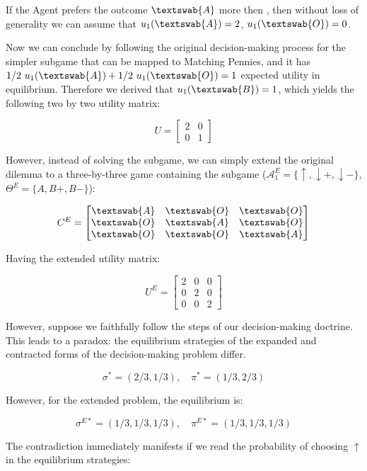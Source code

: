 \documentclass{article}
\begin{document}
If the Agent prefers the outcome $\textswab{A}$ more then , then without loss of generality we can assume that $u_1(\textswab{A})=2$, $u_1(\textswab{O})=0$.

Now we can conclude by following the original decision-making process for the simpler subgame that can be mapped to Matching Pennies, and it has $1/2 \ u_1(\textswab{A}) + 1/2 \ u_1(\textswab{O}) = 1$ expected utility in equilibrium. Therefore we derived that $u_1(\textswab{B}) = 1$, which yields the following two by two utility matrix:

\[
U=
\begin{bmatrix}
2 & 0 \\
0 & 1
\end{bmatrix}
\]

However, instead of solving the subgame, we can simply extend the original dilemma to a three-by-three game containing the subgame ($\mathcal{A}^E_1=\{\uparrow,\downarrow+,\downarrow-\}$, $\Theta^E=\{A,B+,B-\}$):

\[
C^E=
\begin{bmatrix}
\textswab{A} & \textswab{O} & \textswab{O} \\
\textswab{O} & \textswab{A} & \textswab{O} \\
\textswab{O} & \textswab{O} & \textswab{A}
\end{bmatrix}
\]

Having the extended utility matrix:

\[
U^E=
\begin{bmatrix}
2 & 0 & 0 \\
0 & 2 & 0 \\
0 & 0 & 2 
\end{bmatrix}
\]

However, suppose we faithfully follow the steps of our decision-making doctrine. 
This leads to a paradox: the equilibrium strategies of the expanded and contracted forms of the decision-making problem differ.

\[
\sigma^*=(2/3,1/3), \quad
\pi^*=(1/3,2/3)
\]

However, for the extended problem, the equilibrium is:

\[
\sigma^{E*}=(1/3,1/3,1/3), \quad
\pi^{E*}=(1/3,1/3,1/3)
\]

The contradiction immediately manifests if we read the probability of choosing $\uparrow$ in the equilibrium strategies:
\end{document}
